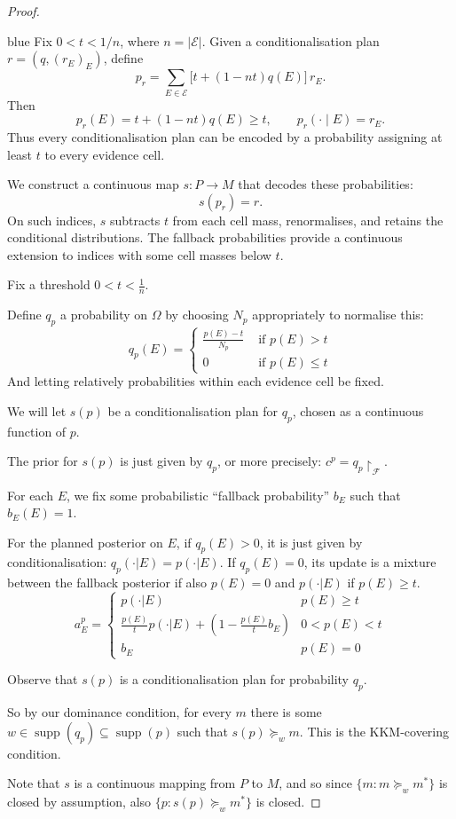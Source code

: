 \documentclass[11pt]{article}
\theoremstyle{definition}
\theoremstyle{remark}
\newcommand{\agenda}{\mathcal F}
\newcommand{\supp}{\operatorname{supp}}
\newenvironment{AIwritten}{\begin{color}{blue}}{\end{color}}
\begin{document}
\begin{proof}
	\begin{AIwritten}
		Fix $0<t<1/n$, where $n=|\mathcal E|$.
		Given a conditionalisation plan $r=(q,(r_E)_E)$, define
		\[
		p_r=\sum_{E\in\mathcal E}
		\bigl[t+(1-nt)q(E)\bigr]\,r_E.
		\]
		Then
		\[
		p_r(E)=t+(1-nt)q(E)\ge t,
		\qquad
		p_r(\cdot\mid E)=r_E.
		\]
		Thus every conditionalisation plan can be encoded by
		a probability assigning at least $t$ to every evidence cell.
		
		We construct a continuous map $s\colon P\to M$ that
		decodes these probabilities:
		\[
		s(p_r)=r.
		\]
		On such indices, $s$ subtracts $t$ from each cell mass,
		renormalises, and retains the conditional distributions.
		The fallback probabilities provide a continuous extension
		to indices with some cell masses below $t$.
	\end{AIwritten}
	
	
	
	
	
	Fix a threshold $0<t<\frac{1}{n}$. 
	
	Define $q_p$ a probability on $\Omega$ by choosing $N_p$ appropriately to normalise this:
	\[q_p(E)=\begin{cases}
		\frac{p(E)-t}{N_p}&\text{ if $p(E)>t$}\\
		0&\text{ if $p(E)\leq t$}
	\end{cases}\]
	And letting relatively probabilities within each evidence cell be fixed. 
	
	We will let $s(p)$ be a conditionalisation plan for $q_p$, chosen as a continuous function of $p$. 
	
	The prior for $s(p)$ is just given by $q_p$, or more precisely: $c^p=q_p\upharpoonright_\agenda$. 
	
	For each $E$, we fix some probabilistic ``fallback probability'' $b_E$ such that $b_E(E)=1$. 
	
	For the planned posterior on $E$, 
	if $q_p(E)>0$, it is just given by conditionalisation: $q_p(\cdot | E)=p(\cdot | E)$. 
	If $q_p(E)=0$, its update is a mixture between the fallback posterior if also $p(E)=0$ and $p(\cdot | E)$ if $p(E)\geq t$. 
	\[a_E^p=\begin{cases}
		p(\cdot | E)& p(E)\geq t\\
		\frac{p(E)}{t}p(\cdot | E)+(1-\frac{p(E)}{t}b_E)&0<p(E)<t\\
		b_E&p(E)=0
	\end{cases}\]
	
	Observe that $s(p)$ is a conditionalisation plan for probability $q_p$. 
	
	So by our dominance condition, for every $m$ there is some $w\in \supp(q_p)\subseteq\supp(p)$ such that $s(p)\succeq_w m$. This is the KKM-covering condition. 
	
	
	Note that $s$ is a continuous mapping from $P$ to $M$, and so since $\{m: m\succeq_w m^*\}$ is closed by assumption, also $\{p :  s(p)\succeq_w m^*\}$ is closed. 
\end{proof}
\end{document}
